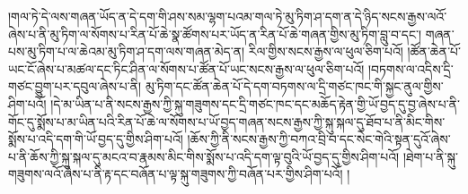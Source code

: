 །གལ་ཏེ་དེ་ལས་གཞན་ཡོད་ན་དེ་དག་གི་ཤས་སམ་ལྷག་པའམ་གལ་ཏེ་མུ་ཏིག་ཤ་དག་ན་དེ་ཉིད་སངས་རྒྱས་ལའོ་ཞེས་པ་ནི་མུ་ཏིག་ལ་སོགས་པ་རིན་པོ་ཆེ་སྣ་ཚོགས་པར་ཡོད་ན་རིན་པོ་ཆེ་གཞན་གྱིས་མུ་ཏིག་བླུ་བ་དང་། གཞན་པས་མུ་ཏིག་པ་ལ་ཆེའམ་མུ་ཏིག་ཤ་དག་ལས་གཞན་མེད་ན། རིལ་གྱིས་སངས་རྒྱས་ལ་ཕུལ་ཅིག་པའོ། །ཚོན་ཆེན་པོ་ཡང་ངོ་ཞེས་པ་མཚལ་དང་ཏིང་ཤིན་ལ་སོགས་པ་ཚོན་པོ་ཡང་སངས་རྒྱས་ལ་ཕུལ་ཅིག་པའོ། །བཏགས་ལ་འདིས་དྲི་གཙང་བྱུག་པར་དབུལ་ཞེས་པ་ནི། མུ་ཏིག་དང་ཚོན་ཆེན་པོ་དེ་དག་བཏགས་ལ་དྲི་གཙང་ཁང་གི་སྐྱང་ནུལ་གྱིས་ཤིག་པའོ། །དེ་མ་ཡིན་པ་ནི་སངས་རྒྱས་ཀྱི་སྐུ་གཟུགས་དང་དྲི་གཙང་ཁང་དང་མཆོད་རྟེན་གྱི་ཡོ་བྱད་དུ་བྱ་ཞེས་པ་ནི་གོང་དུ་སྨོས་པ་མ་ཡིན་པའི་རིན་པོ་ཆེ་ལ་སོགས་པ་ཡོ་བྱད་གཞན་སངས་རྒྱས་ཀྱི་སྐུ་སྐལ་དུ་ཐོབ་པ་ནི་མིང་གིས་སྨོས་པ་འདི་དག་གི་ཡོ་བྱད་དུ་གྱིས་ཤིག་པའོ། །ཆོས་ཀྱི་ནི་སངས་རྒྱས་ཀྱི་བཀའ་བྲི་བ་དང་སེང་གེའི་སྟན་དུའོ་ཞེས་པ་ནི་ཆོས་ཀྱི་སྐུ་སྐལ་དུ་མངའ་བ་རྣམས་མིང་གིས་སྨོས་པ་འདི་དག་ལྟ་བུའི་ཡོ་བྱད་དུ་གྱིས་ཤིག་པའོ། །ཐེག་པ་ནི་སྐུ་གཟུགས་ལའོ་ཞེས་པ་ནི་རྟ་དང་བཞོན་པ་ལྟ་སྐུ་གཟུགས་ཀྱི་བཞོན་པར་གྱིས་ཤིག་པའོ། །
